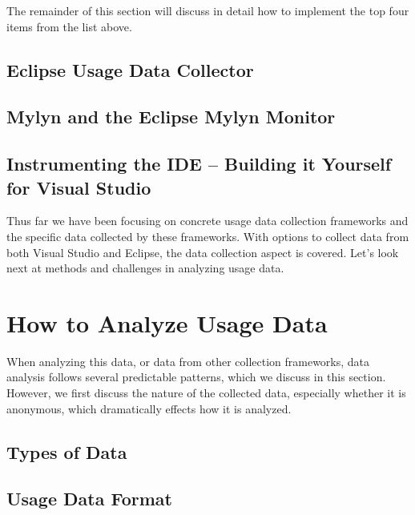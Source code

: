 The remainder of this section will discuss in detail how to implement the top four items from the list above.  

\subsection{Eclipse Usage Data Collector}
\label{EclipseUsageDataCollector}


\subsection{Mylyn and the Eclipse Mylyn Monitor} 
\label{MylynMonitor}




\subsection{Instrumenting the IDE -- Building it Yourself for Visual Studio} 
\label{buildItYourself}


Thus far we have been focusing on concrete usage data collection frameworks and the specific data collected by these frameworks.  With options to collect data from both Visual Studio and Eclipse, the data collection aspect is covered.  Let's look next at methods and challenges in analyzing usage data.

\section{How to Analyze Usage Data}

When analyzing this data, or data from other collection frameworks, data analysis follows several predictable patterns, which we discuss in this section. However, we first discuss the nature of the collected data, especially whether it is anonymous, which dramatically effects how it is analyzed.

\subsection{Types of Data}


\subsection{Usage Data Format}



